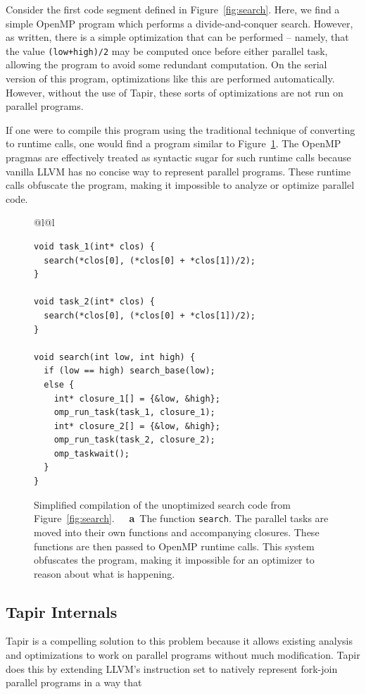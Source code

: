 \documentclass[sigconf]{acmart}
\newcommand{\figref}[1]         {Figure~\ref{fig:#1}}
\newcommand{\subfigcap}[1]      {\textbf{~~#1}}
\def\code{\lstinline[basicstyle=\ttfamily\color{CodeColor}]}
\begin{document}
Consider the first code segment defined in \figref{search}.
Here, we find a simple OpenMP program which performs a divide-and-conquer search.
However, as written, there is a simple optimization that can be performed --
namely, that the value \code{(low+high)/2} may be computed once before either
parallel task, allowing the program to avoid some redundant computation. On
the serial version of this program, optimizations like this are performed
automatically. However, without the use of Tapir, these sorts of optimizations
are not run on parallel programs.

If one were to compile this program using the traditional technique of converting
to runtime calls, one would find a program similar to \figref{runtime_calls}.
The OpenMP pragmas are effectively treated as syntactic sugar for such runtime calls
because vanilla LLVM has no concise way to represent parallel programs.
These runtime calls obfuscate the program, making it impossible to analyze or
optimize parallel code.

\begin{figure}[t]
\begin{tabular*}{\linewidth}{@{\extracolsep{\fill}}l@{}l}
\begin{lstlisting}
void task_1(int* clos) {
  search(*clos[0], (*clos[0] + *clos[1])/2);
}

void task_2(int* clos) {
  search(*clos[0], (*clos[0] + *clos[1])/2);
}

void search(int low, int high) {
  if (low == high) search_base(low);
  else {
    int* closure_1[] = {&low, &high};
    omp_run_task(task_1, closure_1);
    int* closure_2[] = {&low, &high};
    omp_run_task(task_2, closure_2);
    omp_taskwait();
  } 
}
\end{lstlisting}
\vspace{0.1ex}
\end{tabular*}

\caption[Simplified compilation of the unoptimized search code from \figref{search}.]{Simplified compilation of the unoptimized search code from \figref{search}.  \subfigcap{a}~The function \code{search}. The parallel tasks are moved into their own functions and accompanying closures. These functions are then passed to OpenMP runtime calls. This system obfuscates the program, making it impossible for an optimizer to reason about what is happening.}
  \label{fig:runtime_calls}
\end{figure}

\subsection{Tapir Internals}
Tapir is a compelling solution to this problem because it allows existing
analysis and optimizations to work on parallel programs without much modification.
Tapir does this by extending LLVM's instruction set to natively represent
fork-join parallel programs in a way that 
\end{document}

